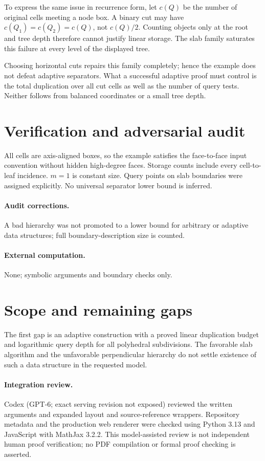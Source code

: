 \documentclass[11pt,a4paper]{article}
\begin{document}
To express the same issue in recurrence form, let $c(Q)$ be the number of
original cells meeting a node box. A binary cut may have
$c(Q_1)=c(Q_2)=c(Q)$, not $c(Q)/2$. Counting objects only at the root and tree
depth therefore cannot justify linear storage. The slab family saturates this
failure at every level of the displayed tree.

Choosing horizontal cuts repairs this family completely; hence the example
does not defeat adaptive separators. What a successful adaptive proof must
control is the total duplication over all cut cells as well as the number of
query tests. Neither follows from balanced coordinates or a small tree depth.
\section{Verification and adversarial audit}
All cells are axis-aligned boxes, so the example satisfies the face-to-face
input convention without hidden high-degree faces. Storage counts include every
cell-to-leaf incidence. $m=1$ is constant size. Query points on slab boundaries
were assigned explicitly. No universal separator lower bound is inferred.
\paragraph{Audit corrections.} A bad hierarchy was not promoted to a lower bound for arbitrary or adaptive data structures; full boundary-description size is counted.
\paragraph{External computation.} None; symbolic arguments and boundary checks only.
\section{Scope and remaining gaps}
The first gap is an adaptive construction with a proved linear duplication
budget and logarithmic query depth for all polyhedral subdivisions. The favorable
slab algorithm and the unfavorable perpendicular hierarchy do not settle existence
of such a data structure in the requested model.
\paragraph{Integration review.} Codex (GPT-6; exact serving revision not exposed) reviewed the written arguments and expanded layout and source-reference wrappers. Repository metadata and the production web renderer were checked using Python 3.13 and JavaScript with MathJax 3.2.2. This model-assisted review is not independent human proof verification; no PDF compilation or formal proof checking is asserted.
\end{document}
